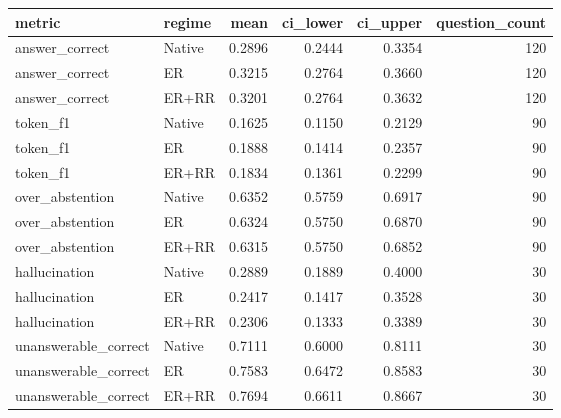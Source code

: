 \begin{tabular}{llrrrr}
\toprule
metric & regime & mean & ci_lower & ci_upper & question_count \\
\midrule
answer_correct & Native & 0.2896 & 0.2444 & 0.3354 & 120 \\
answer_correct & ER & 0.3215 & 0.2764 & 0.3660 & 120 \\
answer_correct & ER+RR & 0.3201 & 0.2764 & 0.3632 & 120 \\
token_f1 & Native & 0.1625 & 0.1150 & 0.2129 & 90 \\
token_f1 & ER & 0.1888 & 0.1414 & 0.2357 & 90 \\
token_f1 & ER+RR & 0.1834 & 0.1361 & 0.2299 & 90 \\
over_abstention & Native & 0.6352 & 0.5759 & 0.6917 & 90 \\
over_abstention & ER & 0.6324 & 0.5750 & 0.6870 & 90 \\
over_abstention & ER+RR & 0.6315 & 0.5750 & 0.6852 & 90 \\
hallucination & Native & 0.2889 & 0.1889 & 0.4000 & 30 \\
hallucination & ER & 0.2417 & 0.1417 & 0.3528 & 30 \\
hallucination & ER+RR & 0.2306 & 0.1333 & 0.3389 & 30 \\
unanswerable_correct & Native & 0.7111 & 0.6000 & 0.8111 & 30 \\
unanswerable_correct & ER & 0.7583 & 0.6472 & 0.8583 & 30 \\
unanswerable_correct & ER+RR & 0.7694 & 0.6611 & 0.8667 & 30 \\
\bottomrule
\end{tabular}
